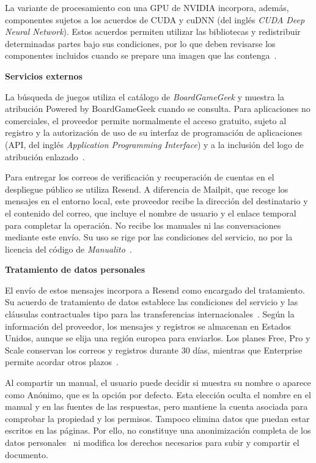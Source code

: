La variante de procesamiento con una \ac{GPU} de NVIDIA incorpora, además,
componentes sujetos a los acuerdos de \acs{CUDA} y \acs{cuDNN} (del inglés
\textit{CUDA Deep Neural Network}). Estos acuerdos permiten
utilizar las bibliotecas y redistribuir determinadas partes bajo sus
condiciones, por lo que deben revisarse los componentes incluidos cuando se
prepare una imagen que las contenga~\cite{nvidia_cuda_licencia,
nvidia_cudnn_licencia}.

\noindent\textbf{Servicios externos}\par

La búsqueda de juegos utiliza el catálogo de \textit{BoardGameGeek} y muestra
la atribución \guillemotleft{}Powered by BoardGameGeek\guillemotright{} cuando se consulta. Para aplicaciones
no comerciales, el proveedor permite normalmente el acceso gratuito,
sujeto al registro y la autorización de uso de su interfaz de programación de aplicaciones
(\acs{API}, del inglés \textit{Application Programming Interface})
y a la inclusión
del logo de atribución enlazado~\cite{boardgamegeek_api_condiciones}.

Para entregar los correos de verificación y recuperación de cuentas en el
despliegue público se utiliza Resend. A diferencia de Mailpit, que recoge
los mensajes en el entorno local, este proveedor recibe la dirección del
destinatario y el contenido del correo, que incluye el nombre de usuario
y el enlace temporal para completar la operación. No recibe los manuales
ni las conversaciones mediante este envío. Su uso se rige por las
condiciones del servicio, no por la licencia del código de
\textit{Manualito}~\cite{resend_condiciones}.

\noindent\textbf{Tratamiento de datos personales}\par

El envío de estos mensajes incorpora a Resend como encargado del
tratamiento. Su acuerdo de tratamiento de datos establece las condiciones
del servicio y las cláusulas contractuales tipo para las transferencias
internacionales~\cite{resend_tratamiento}. Según la información del proveedor,
los mensajes y registros se almacenan en Estados Unidos, aunque se elija
una región europea para enviarlos. Los planes Free, Pro y Scale conservan
los correos y registros durante 30 días, mientras que Enterprise permite
acordar otros plazos~\cite{resend_privacidad}.


Al compartir un manual, el usuario puede decidir si muestra su nombre o
aparece como \guillemotleft{}Anónimo\guillemotright{}, que es la opción por
defecto. Esta elección oculta el nombre en el manual y en las fuentes de
las respuestas, pero mantiene la cuenta asociada para comprobar la
propiedad y los permisos. Tampoco elimina datos que puedan estar escritos
en las páginas. Por ello, no constituye una anonimización completa de
los datos personales~\cite{aepd_datos_anonimizados} ni modifica los derechos
necesarios para subir y compartir el documento.

